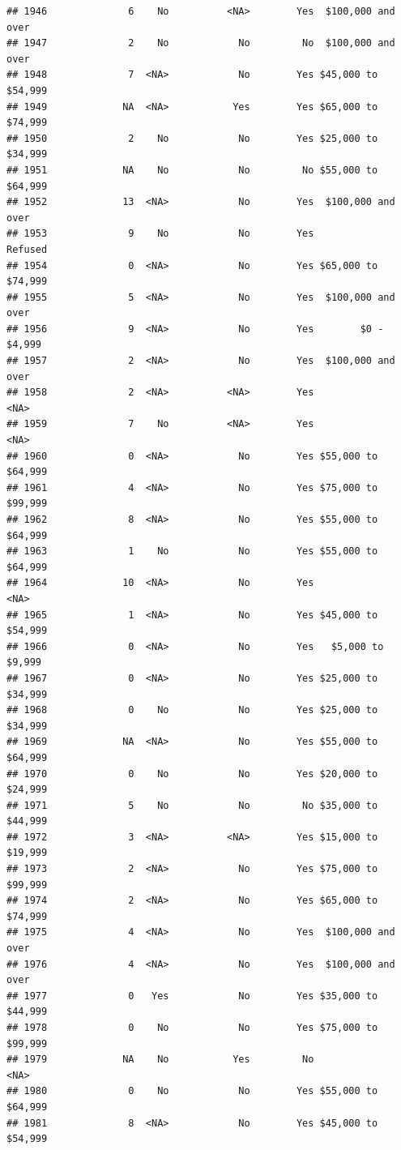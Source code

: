 \documentclass[man]{apa6}
\begin{document}
\begin{verbatim}
## 1946              6    No          <NA>        Yes  $100,000 and over
## 1947              2    No            No         No  $100,000 and over
## 1948              7  <NA>            No        Yes $45,000 to $54,999
## 1949             NA  <NA>           Yes        Yes $65,000 to $74,999
## 1950              2    No            No        Yes $25,000 to $34,999
## 1951             NA    No            No         No $55,000 to $64,999
## 1952             13  <NA>            No        Yes  $100,000 and over
## 1953              9    No            No        Yes            Refused
## 1954              0  <NA>            No        Yes $65,000 to $74,999
## 1955              5  <NA>            No        Yes  $100,000 and over
## 1956              9  <NA>            No        Yes        $0 - $4,999
## 1957              2  <NA>            No        Yes  $100,000 and over
## 1958              2  <NA>          <NA>        Yes               <NA>
## 1959              7    No          <NA>        Yes               <NA>
## 1960              0  <NA>            No        Yes $55,000 to $64,999
## 1961              4  <NA>            No        Yes $75,000 to $99,999
## 1962              8  <NA>            No        Yes $55,000 to $64,999
## 1963              1    No            No        Yes $55,000 to $64,999
## 1964             10  <NA>            No        Yes               <NA>
## 1965              1  <NA>            No        Yes $45,000 to $54,999
## 1966              0  <NA>            No        Yes   $5,000 to $9,999
## 1967              0  <NA>            No        Yes $25,000 to $34,999
## 1968              0    No            No        Yes $25,000 to $34,999
## 1969             NA  <NA>            No        Yes $55,000 to $64,999
## 1970              0    No            No        Yes $20,000 to $24,999
## 1971              5    No            No         No $35,000 to $44,999
## 1972              3  <NA>          <NA>        Yes $15,000 to $19,999
## 1973              2  <NA>            No        Yes $75,000 to $99,999
## 1974              2  <NA>            No        Yes $65,000 to $74,999
## 1975              4  <NA>            No        Yes  $100,000 and over
## 1976              4  <NA>            No        Yes  $100,000 and over
## 1977              0   Yes            No        Yes $35,000 to $44,999
## 1978              0    No            No        Yes $75,000 to $99,999
## 1979             NA    No           Yes         No               <NA>
## 1980              0    No            No        Yes $55,000 to $64,999
## 1981              8  <NA>            No        Yes $45,000 to $54,999

\end{verbatim}
\end{document}
